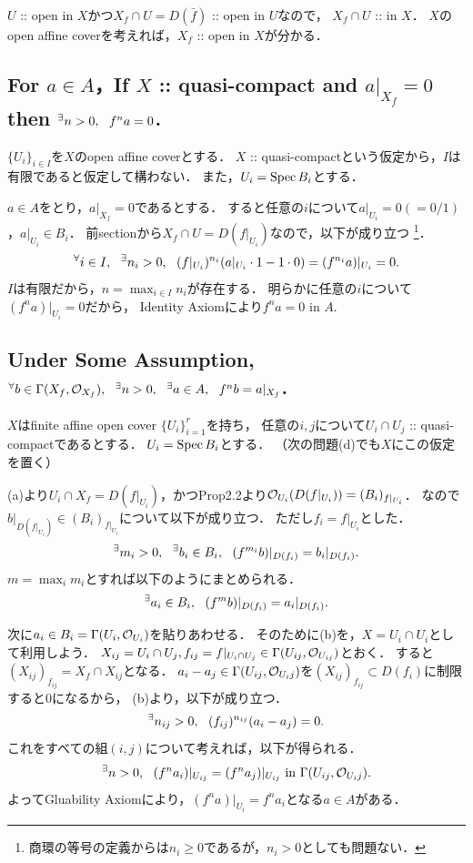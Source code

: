 \documentclass[a4paper]{jsarticle}
\begin{document}
    $U$ :: open in $X$かつ$X_f \cap U=D(\bar{f})$ :: open in $U$なので，
    $X_f \cap U$ :: in $X$．
    $X$のopen affine coverを考えれば，$X_f$ :: open in $X$が分かる．

    \subsection{For $a \in A$，If $X$ :: quasi-compact and $a|_{X_f}=0$ then ${}^{\exists} n > 0,~~ f^n a=0$.}
    $\{U_i\}_{i \in I}$を$X$のopen affine coverとする．
    $X$ :: quasi-compactという仮定から，$I$は有限であると仮定して構わない．
    また，$U_i = \operatorname{Spec} B_i$とする．

    $a \in A$をとり，$a|_{X_f}=0$であるとする．
    すると任意の$i$について$a|_{U_i}=0(=0/1)$，$a|_{U_i} \in B_i$．
    前sectionから$X_f \cap U=D(f|_{U_i})$なので，以下が成り立つ
    \footnote{商環の等号の定義からは$n_i \geq 0$であるが，$n_i>0$としても問題ない．}．
    \[ {}^{\forall} i \in I,~~ {}^{\exists} n_i>0,~~ (f|_{U_i})^{n_i}(a|_{U_i} \cdot 1-1 \cdot 0)=(f^{n_i}a)|_{U_i}=0. \]
    $I$は有限だから，$n=\max_{i \in I} n_i$が存在する．
    明らかに任意の$i$について$(f^{n}a)|_{U_i}=0$だから，
    Identity Axiomにより$f^n a=0$ in $A$.

    \subsection{Under Some Assumption, ${}^{\forall} b \in \Gamma(X_f, \mathcal{O}_{X_f}),~~ {}^{\exists} n>0,~~ {}^{\exists} a \in A,~~ f^n b=a|_{X_f}$.}
    $X$はfinite affine open cover $\{U_i\}_{i=1}^r$を持ち，
    任意の$i,j$について$U_i \cap U_j$ :: quasi-compactであるとする．
    $U_i=\operatorname{Spec} B_i$とする．
    （次の問題(d)でも$X$にこの仮定を置く）

    (a)より$U_i \cap X_f=D(f|_{U_i})$，かつProp2.2より$\mathcal{O}_{U_i}(D(f|_{U_i}))=(B_i)_{f|_{U_i}}$．
    なので$b|_{D(f|_{U_i})} \in (B_i)_{f|_{U_i}}$について以下が成り立つ．
    ただし$f_i=f|_{U_i}$とした．
    \[ {}^{\exists} m_i>0,~~ {}^{\exists} b_i \in B_i,~~ (f^{m_i}b)|_{D(f_i)}=b_i|_{D(f_i)}. \]
    $m=\max_i m_i$とすれば以下のようにまとめられる．
    \[ {}^{\exists} a_i \in B_i,~~ (f^{m}b)|_{D(f_i)}=a_i|_{D(f_i)}. \]

    次に$a_i \in B_i=\Gamma(U_i, \mathcal{O}_{U_i})$を貼りあわせる．
    そのために(b)を，$X=U_i \cap U_i$として利用しよう．
    $X_{ij}=U_i \cap U_j, f_{ij}=f|_{U_i \cap U_j} \in \Gamma(U_{ij},\mathcal{O}_{U_{ij}})$とおく．
    すると$(X_{ij})_{f_{ij}}=X_f \cap X_{ij}$となる．
    $a_i-a_j \in \Gamma(U_{ij},\mathcal{O}_{U_ij})$を$(X_{ij})_{f_{ij}} \subset D(f_{i})$に制限すると0になるから，
    (b)より，以下が成り立つ．
    \[ {}^{\exists} n_{ij}>0,~~ (f_{ij})^{n_{ij}}(a_i-a_j)=0. \]
    これをすべての組$(i,j)$について考えれば，以下が得られる．
    \[ {}^{\exists} n>0,~~ (f^n a_i)|_{U_{ij}}=(f^n a_j)|_{U_{ij}} \text{ in } \Gamma(U_{ij},\mathcal{O}_{U_ij}).  \]
    よってGluability Axiomにより，$(f^n a)|_{U_i}=f^n a_i$となる$a \in A$がある．
\end{document}

